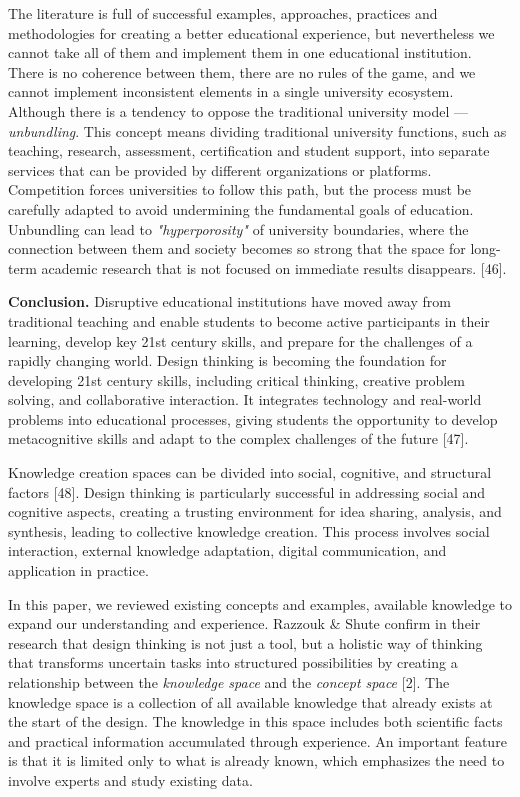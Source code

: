 The literature is full of successful examples, approaches, practices and
methodologies for creating a better educational experience, but
nevertheless we cannot take all of them and implement them in one
educational institution. There is no coherence between them, there are
no rules of the game, and we cannot implement inconsistent elements in a
single university ecosystem. Although there is a tendency to oppose the
traditional university model --- \emph{unbundling}. This concept means
dividing traditional university functions, such as teaching, research,
assessment, certification and student support, into separate services
that can be provided by different organizations or platforms.
Competition forces universities to follow this path, but the process
must be carefully adapted to avoid undermining the fundamental goals of
education. Unbundling can lead to \emph{"hyperporosity"} of university
boundaries, where the connection between them and society becomes so
strong that the space for long-term academic research that is not
focused on immediate results disappears. {[}46{]}.

{\bfseries Conclusion.} Disruptive educational institutions have moved away
from traditional teaching and enable students to become active
participants in their learning, develop key 21st century skills, and
prepare for the challenges of a rapidly changing world. Design thinking
is becoming the foundation for developing 21st century skills, including
critical thinking, creative problem solving, and collaborative
interaction. It integrates technology and real-world problems into
educational processes, giving students the opportunity to develop
metacognitive skills and adapt to the complex challenges of the future
{[}47{]}.

Knowledge creation spaces can be divided into social, cognitive, and
structural factors {[}48{]}. Design thinking is particularly successful
in addressing social and cognitive aspects, creating a trusting
environment for idea sharing, analysis, and synthesis, leading to
collective knowledge creation. This process involves social interaction,
external knowledge adaptation, digital communication, and application in
practice.

In this paper, we reviewed existing concepts and examples, available
knowledge to expand our understanding and experience. Razzouk \& Shute
confirm in their research that design thinking is not just a tool, but a
holistic way of thinking that transforms uncertain tasks into structured
possibilities by creating a relationship between the \emph{knowledge
space} and the \emph{concept space} {[}2{]}. The knowledge space is a
collection of all available knowledge that already exists at the start
of the design. The knowledge in this space includes both scientific
facts and practical information accumulated through experience. An
important feature is that it is limited only to what is already known,
which emphasizes the need to involve experts and study existing data.

